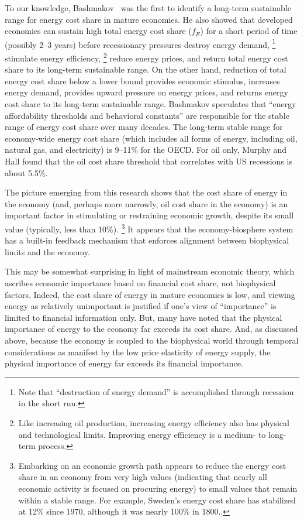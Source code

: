 To our knowledge, 
Bashmakov~\cite{Bashmakov:2007ek} was the first to 
identify a long-term sustainable range for energy cost share
in mature economies.
He also showed that developed economies 
can sustain high total energy cost share ($f_E$) 
for a short period of time 
(possibly 2--3 years) 
before recessionary pressures 
destroy energy demand,%
	\footnote{
	Note that ``destruction of energy demand'' 
	is accomplished through recession
	in the short run.
	}
stimulate energy efficiency,%
	\footnote{
	Like increasing oil production, 
	increasing energy efficiency also has 
	physical and technological limits.
	Improving energy efficiency is a medium- to long-term process. 
	}
reduce energy prices, 
and return total energy cost share to its long-term sustainable range.
On the other hand, reduction of total energy cost share below 
a lower bound provides economic stimulus, 
increases energy demand, 
provides upward pressure on energy prices, 
and returns energy cost share to its long-term sustainable range.
Bashmakov speculates that 
``energy affordability thresholds and behavioral constants'' 
are responsible for the stable range of energy cost share 
over many decades.\cite[p.~3585]{Bashmakov:2007ek} 
The long-term stable range for economy-wide energy cost share 
(which includes all forms of energy, including oil, natural gas, and electricity)
is 9--11\% for the OECD. 
For oil only, Murphy and Hall found that 
the oil cost share threshold that correlates with US recessions 
is about 5.5\%.\cite{Murphy:2011jh}

The picture emerging from this research shows that 
the cost share of energy in the economy
(and, perhaps more narrowly, oil cost share in the economy)
is an important factor in stimulating or restraining economic growth,
despite its small value (typically, less than 10\%).%
	\footnote{
	Embarking on an economic growth path
	appears to reduce the energy cost share in an economy from very high values
	(indicating that nearly all economic activity is focused on procuring energy)
	to small values that remain within a stable range.
	For example, Sweden's energy cost share has stabilized at 12\% since 1970,
	although it was nearly 100\% in 1800.\cite{Stern:2012ey}.
	}
It appears that the economy-biosphere system has 
a built-in feedback mechanism that 
enforces alignment between biophysical limits and the economy.

This may be somewhat surprising in light of mainstream economic theory, 
which ascribes economic importance 
based on financial cost share, 
not biophysical factors. 
Indeed, the cost share of energy in mature economies is low, 
and viewing energy as relatively unimportant is justified if
one's view of ``importance'' is limited to financial information only.
But, many have noted that the physical importance of energy to the economy 
far exceeds its cost share.\cite{Ayres:2013aa}
And, as discussed above, because the economy is coupled 
to the biophysical world through temporal considerations as manifest 
by the low price elasticity of energy supply, 
the physical importance of energy far exceeds its financial importance.


